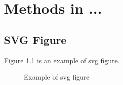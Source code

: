 \chapter{Methods in ...}

\section{SVG Figure}
Figure \ref{fig:example_svg} is an example of svg figure.

\begin{figure}[H]
  \centering
  
  \caption{Example of svg figure}
  \label{fig:example_svg}
\end{figure}
